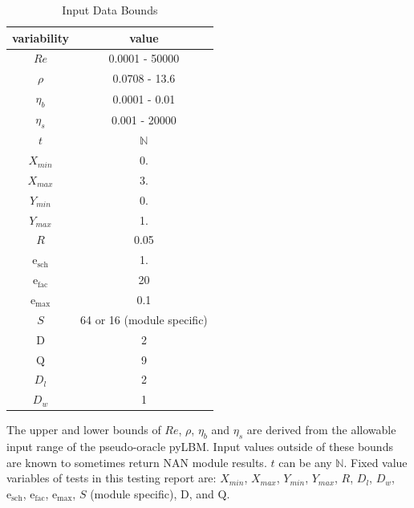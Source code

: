 \documentclass[12pt, titlepage]{article}
\begin{document}
\begin{table}[!h]
\begin{center}
\begin{tabular}{| c | c |}
\hline
\textbf{variability} & \textbf{value}\\
\hline
$Re$& 0.0001 - 50000\\
\hline
$\rho$ & 0.0708 - 13.6\\
\hline
$\eta_b$ & 0.0001 - 0.01\\
\hline
$\eta_s$ & 0.001 - 20000\\
\hline
$t$ & $\mathbb{N}$\\
\hline
$X_{min}$ & 0.\\
\hline
$X_{max}$ & 3.\\
\hline
$Y_{min}$ & 0.\\
\hline
$Y_{max}$ & 1.\\
\hline
$R$ & 0.05\\
\hline
$\mathrm{e_{sch}}$ & 1.\\
\hline
$\mathrm{e_{fac}}$ & 20\\
\hline
$\mathrm{e_{max}}$ & 0.1\\
\hline
$S$ & 64 or 16 (module specific)\\
\hline
$\mathrm{D}$ & 2\\
\hline
$\mathrm{Q}$ & 9\\
\hline
$D_{l}$ & 2\\
\hline
$D_{w}$ & 1\\
\hline
\end{tabular}
\caption{Input Data Bounds}
\label{table:inputdatabounds}
\end{center}
\end{table}


\noindent The upper and lower bounds of $Re$, $\rho$, $\eta_b$ and $\eta_s$ are derived from the allowable input range of the pseudo-oracle pyLBM. Input values outside of these bounds are known to sometimes return NAN module results. $t$ can be any $\mathbb{N}$. Fixed value variables of tests in this testing report are: $X_{min}$, $X_{max}$, $Y_{min}$, $Y_{max}$, $R$, $D_{l}$, $D_{w}$, $\mathrm{e_{sch}}$, $\mathrm{e_{fac}}$, $\mathrm{e_{max}}$, $S$ (module specific), $\mathrm{D}$, and $\mathrm{Q}$.
\end{document}
